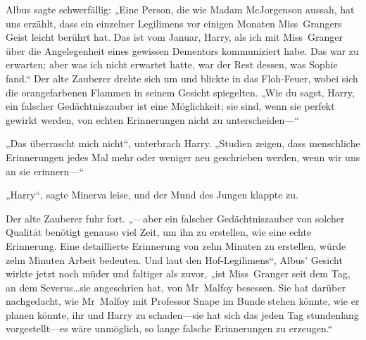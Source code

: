 Albus sagte schwerfällig: „Eine Person, die wie Madam McJorgenson aussah, hat uns erzählt, dass ein einzelner Legilimens vor einigen Monaten Miss~Grangers Geist leicht berührt hat. Das ist vom Januar, Harry, als ich mit Miss~Granger über die Angelegenheit eines gewissen Dementors kommuniziert habe. Das war zu erwarten; aber was ich nicht erwartet hatte, war der Rest dessen, was Sophie fand.“
Der alte Zauberer drehte sich um und blickte in das Floh-Feuer, wobei sich die orangefarbenen Flammen in seinem Gesicht spiegelten. „Wie du sagst, Harry, ein falscher Gedächtniszauber ist eine Möglichkeit; sie sind, wenn sie perfekt gewirkt werden, von echten Erinnerungen nicht zu unterscheiden—“

„Das überrascht mich nicht“, unterbrach Harry. „Studien zeigen, dass menschliche Erinnerungen jedes Mal mehr oder weniger neu geschrieben werden, wenn wir uns an sie erinnern—“

„Harry“, sagte Minerva leise, und der Mund des Jungen klappte zu.

Der alte Zauberer fuhr fort. „—aber ein falscher Gedächtniszauber von solcher Qualität benötigt genauso viel Zeit, um ihn zu erstellen, wie eine echte Erinnerung. Eine detaillierte Erinnerung von zehn Minuten zu erstellen, würde zehn Minuten Arbeit bedeuten. Und laut den Hof-Legilimens“, Albus’ Gesicht wirkte jetzt noch müder und faltiger als zuvor, „ist Miss~Granger seit dem Tag, an dem Severus…sie angeschrien hat, von Mr~Malfoy besessen. Sie hat darüber nachgedacht, wie Mr~Malfoy mit Professor Snape im Bunde stehen könnte, wie er planen könnte, ihr und Harry zu schaden—sie hat sich das jeden Tag stundenlang vorgestellt—es wäre unmöglich, so lange falsche Erinnerungen zu erzeugen.“

